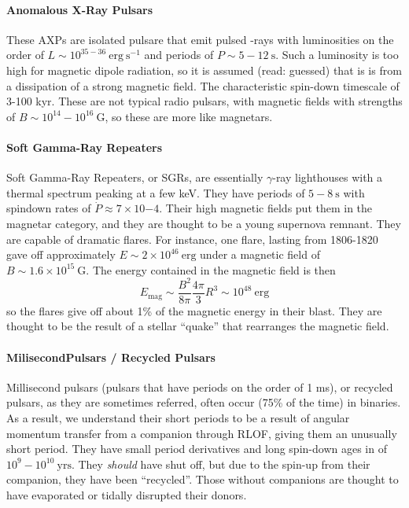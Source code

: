 \documentclass[10pt]{article}
\numberwithin{equation}{section}
\begin{document}
	\paragraph{Anomalous X-Ray Pulsars} %
	\label{par:anomalous_x_ray_pulsars}
	 These AXPs are isolated pulsare that emit pulsed -rays with luminosities on the order of $L\sim 10^{35-36}\ \mathrm{erg\ s^{-1}}$ and periods of $P\sim 5-12\ \mathrm{s}$. Such a luminosity is too high for magnetic dipole radiation, so it is assumed (read: guessed) that is is from a dissipation of a strong magnetic field. The characteristic spin-down timescale of 3-100 kyr. These are not typical radio pulsars, with magnetic fields with strengths of $B\sim 10^{14}-10^{16}\ \mathrm{G}$, so these are more like magnetars. 
	\paragraph{Soft Gamma-Ray Repeaters} %
	\label{par:soft_gamma_ray_repeaters}
		Soft Gamma-Ray Repeaters, or SGRs, are essentially $\gamma$-ray lighthouses with a thermal spectrum peaking at a few keV. They have periods of $5-8\ \mathrm{s}$ with spindown rates of $\dot{P}\approx 7\times 10{-4}$. Their high magnetic fields put them in the magnetar category, and they are thought to be a young supernova remnant. They are capable of dramatic flares. For instance, one flare, lasting from 1806-1820 gave off approximately $E\sim 2\times 10^{46}\ \mathrm{erg}$ under a magnetic field of $B\sim 1.6\times 10^{15}\ \mathrm{G}$. The energy contained in the magnetic field is then
		\begin{equation}
			\label{eq:SGR:1} E_{\mathrm{mag}} \sim \frac{B^2}{8\pi}\frac{4\pi}{3} R^3 \sim 10^{48}\ \mathrm{erg}
		\end{equation}
		so the flares give off about 1\% of the magnetic energy in their blast. They are thought to be the result of a stellar ``quake'' that rearranges the magnetic field.
	\paragraph{MilisecondPulsars / Recycled Pulsars} %
	\label{par:milisecondpulsars_recycled_pulsars}
	Millisecond pulsars (pulsars that have periods on the order of 1 ms), or recycled pulsars, as they are sometimes referred, often occur (75\% of the time) in binaries. As a result, we understand their short periods to be a result of angular momentum transfer from a companion through RLOF, giving them an unusually short period. They have small period derivatives and long spin-down ages in of $10^9-10^{10}\ \mathrm{yrs}$. They \emph{should} have shut off, but due to the spin-up from their companion, they have been ``recycled''. Those without companions are thought to have evaporated or tidally disrupted their donors.
\end{document}
